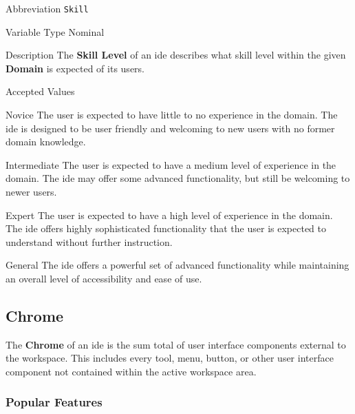 \begin{AlignedDesc}
  \item[Abbreviation] \texttt{Skill}

  \item[Variable Type] Nominal

  \item[Description] The \textbf{Skill Level} of an \ac{ide} describes what
  skill level within the given \textbf{Domain} is expected of its users.

  \item[Accepted Values]

  \begin{AlignedDesc}
    \item[Novice] The user is expected to have little to no experience in
    the domain. The \ac{ide} is designed to be user friendly and welcoming
    to new users with no former domain knowledge.
    \item[Intermediate] The user is expected to have a medium level of
    experience in the domain. The \ac{ide} may offer some advanced
    functionality, but still be welcoming to newer users.
    \item[Expert] The user is expected to have a high level of experience
    in the domain. The \ac{ide} offers highly sophisticated functionality
    that the user is expected to understand without further instruction.
    \item[General] The \ac{ide} offers a powerful set of advanced
    functionality while maintaining an overall level of accessibility and
    ease of use.
  \end{AlignedDesc}

\end{AlignedDesc}


\subsection{Chrome}
\label{subsec:chrome}

The \textbf{Chrome} of an \ac{ide} is the sum total of user interface
components external to the workspace. This includes every tool, menu,
button, or other user interface component not contained within the active
workspace area.

\subsubsection{Popular Features}
\label{subsubsec:features}

